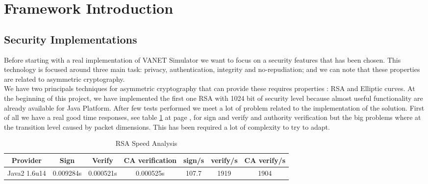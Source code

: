 \section{Framework Introduction}
\subsection{Security Implementations}
Before starting with  a real implementation of VANET Simulator we want to focus on a security features  that has been chosen. This technology is focused around three main task: privacy, authentication, integrity and no-repudiation; and we can note that these properties are related to asymmetric cryptography.\\ 
We have two  principals techniques for asymmetric cryptography that can provide these requires properties : RSA and Elliptic curves. At the beginning of this project, we have implemented the first one RSA with 1024 bit of security level because almost useful functionality are already available for Java Platform. After few tests performed we meet a lot of problem related to the implementation of the solution. First of all we have a  real good time responses, see table \ref{tab:RSAVelocity} at page \pageref{tab:RSAVelocity}, for sign and verify and authority verification but the big problems where at the transition level caused by packet dimensions. This has been required a lot of complexity to try to adapt.

\begin{table}[!ht]
	\centering
	\caption{RSA Speed Analysis}
	\begin{tabular}{|c|c|c|c|c|c|c|}
	\hline\hline 
	\textbf{Provider} & \textbf{Sign} & \textbf{Verify} & \textbf{CA verification} & \textbf{sign/s} & \textbf{verify/s}  & \textbf{CA verify/s}\\
	\hline
	Java2 1.6u14 & 0.009284s & 0.000521s & 0.000525s & 107.7 & 1919 & 1904 \\
	\hline
	\hline     %
 	\end{tabular} 
	\label{tab:RSAVelocity}
\end{table}
